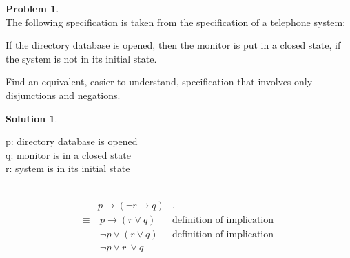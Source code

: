 \documentclass{article}
\theoremstyle{definition}
\newtheorem{problem}{Problem}
\newtheorem*{solution}{Solution}
\begin{document}
\newpage

\begin{problem}\ \\
The following specification is taken from the specification of a telephone system:
\begin{displayquote}
If the directory database is opened, then the monitor is put in a closed state, if the system is not in its initial state.
\end{displayquote}
Find an equivalent, easier to understand, specification that involves only disjunctions and negations.
\end{problem}

\begin{solution}\ \\
\begin{compactenum}
\indent p: directory database is opened\\
\indent q: monitor is in a closed state\\
\indent r: system is in its initial state\\
\\
\end{compactenum}
\begin{align*}
    & p \to ( \neg r \to q) & \text {.}\ \\ 
    \equiv & \ p \to ( r \vee q) & \text {definition of implication}\ \\
    \equiv & \ \neg p \vee (r \vee q) & \text {definition of implication}\\
    \equiv & \ \neg p  \vee r \ \vee q\\
\end{align*}
\end{solution}

\newpage
\end{document}
